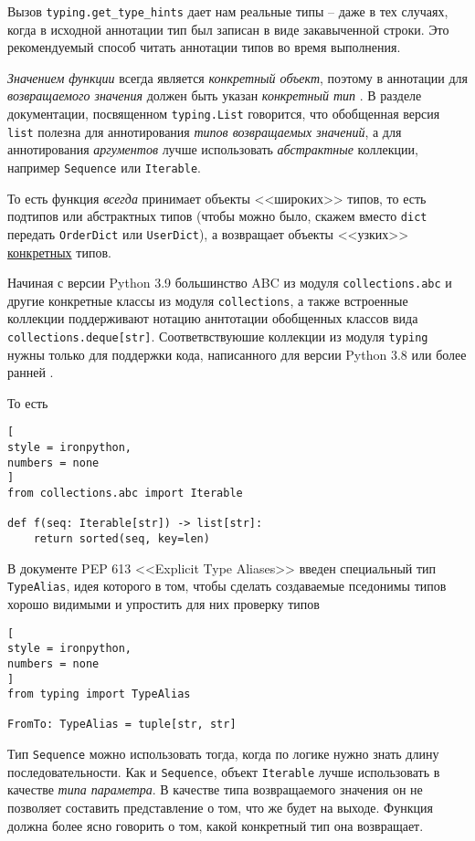 \documentclass[%
	11pt,
	a4paper,
	utf8,
		]{article}
\begin{document}
Вызов \verb|typing.get_type_hints| дает нам реальные типы -- даже в тех случаях, когда в исходной аннотации тип был записан в виде закавыченной строки. Это рекомендуемый способ читать аннотации типов во время выполнения.




\emph{Значением функции} всегда является \emph{конкретный объект}, поэтому в аннотации для \emph{возвращаемого значения} должен быть указан \emph{конкретный тип} \cite[]{ramalho:python-2022}. В разделе документации, посвященном \verb*|typing.List| говорится, что обобщенная версия \verb*|list| полезна для аннотирования 
\emph{типов возвращаемых значений}, а для аннотирования \emph{аргументов} лучше использовать \emph{абстрактные} коллекции, например \verb*|Sequence| или \verb*|Iterable|.

{\color{blue}
То есть функция \emph{всегда} принимает объекты <<широких>> типов, то есть подтипов или абстрактных типов (чтобы можно было, скажем вместо \verb*|dict| передать \verb*|OrderDict| или \verb*|UserDict|), а возвращает объекты <<узких>> \underline{конкретных} типов.
}

Начиная с версии Python 3.9 большинство ABC из модуля \verb*|collections.abc| и другие конкретные классы из модуля \verb*|collections|, а также встроенные коллекции поддерживают нотацию аннтотации обобщенных классов вида \verb*|collections.deque[str]|. Соответвствуюшие коллекции из модуля \verb*|typing| нужны только для поддержки кода, написанного для версии Python 3.8 или более ранней \cite[]{ramalho:python-2022}.

То есть
\begin{lstlisting}[
style = ironpython,
numbers = none
]
from collections.abc import Iterable

def f(seq: Iterable[str]) -> list[str]:
    return sorted(seq, key=len)
\end{lstlisting}

В документе PEP 613 <<Explicit Type Aliases>> введен специальный тип \verb|TypeAlias|, идея которого в том, чтобы сделать создаваемые пседонимы типов хорошо видимыми и упростить для них проверку типов
\begin{lstlisting}[
style = ironpython,
numbers = none
]
from typing import TypeAlias

FromTo: TypeAlias = tuple[str, str]
\end{lstlisting}

Тип \verb*|Sequence| можно использовать тогда, когда по логике нужно знать длину последовательности. Как и \verb*|Sequence|, объект \verb*|Iterable| лучше использовать в качестве \emph{типа параметра}. В качестве типа возвращаемого значения он не позволяет составить представление о том, что же будет на выходе. Функция должна более ясно говорить о том, какой конкретный тип она возвращает.
\end{document}
